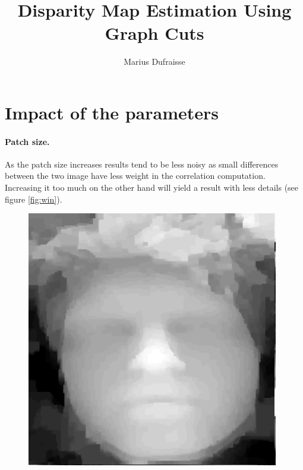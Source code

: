 \documentclass[]{article}
\title{Disparity Map Estimation Using Graph Cuts}
\author{Marius Dufraisse}
\date{}
\begin{document}
\maketitle

\section*{Impact of the parameters}
\paragraph{Patch size.}
As the patch size increases results tend to be less noisy as small differences between the two image have less weight in the correlation computation. Increasing it too much on the other hand will yield a result with less details (see figure \ref{fig:win}).
\begin{figure}[h]
	\centering
	\begin{minipage}{0.24\linewidth}
		\includegraphics[width=\linewidth]{results/thierry_n3_l2.png}
	\end{minipage}\hfill
	\begin{minipage}{0.24\linewidth}

\end{minipage}
\end{figure}
\end{document}
